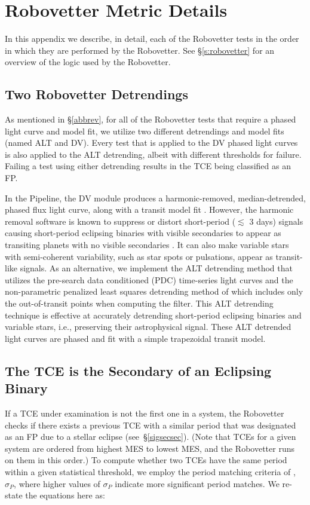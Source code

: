 \section{Robovetter Metric Details}
\label{s:metrics}
In this appendix we describe, in detail, each of the Robovetter tests in the order in which they are performed by the Robovetter. See \S\ref{s:robovetter} for an overview of the logic used by the Robovetter.

\subsection{Two Robovetter Detrendings}
As mentioned in \S\ref{abbrev}, for all of the Robovetter tests that require a phased light curve and model fit, we utilize two different detrendings and model fits (named ALT and DV). Every test that is applied to the DV phased light curves is also applied to the ALT detrending, albeit with different thresholds for failure. Failing a test using either detrending results in the TCE being classified as an FP.

In the \kepler{} Pipeline, the DV module produces a harmonic-removed, median-detrended, phased flux light curve, along with a transit model fit \citep{JenkinsKDPH,Wu2010}. However, the harmonic removal software is known to suppress or distort short-period ($\lesssim$ 3 days) signals causing short-period eclipsing binaries with visible secondaries to appear as transiting planets with no visible secondaries \citep{Christiansen2013b}. It can also make variable stars with semi-coherent variability, such as star spots or pulsations, appear as transit-like signals. As an alternative, we implement the ALT detrending method that utilizes the pre-search data conditioned (PDC) time-series light curves and the non-parametric penalized least squares detrending method of \citet{Garcia2010} which includes only the out-of-transit points when computing the filter. This ALT detrending technique is effective at accurately detrending short-period eclipsing binaries and variable stars, i.e., preserving their astrophysical signal.  These ALT detrended light curves are phased and fit with a simple trapezoidal transit model. 



\subsection{The TCE is the Secondary of an Eclipsing Binary}
\label{s:issecond}
If a TCE under examination is not the first one in a system, the Robovetter checks if there exists a previous TCE with a similar period that was designated as an FP due to a stellar eclipse (see~\S\ref{sigsecsec}). (Note that TCEs for a given system are ordered from highest MES to lowest MES, and the Robovetter runs on them in this order.) To compute whether two TCEs have the same period within a given statistical threshold, we employ the period matching criteria of \citet[][see equations 1-3]{Coughlin2014a}, $\sigma_{P}$, where higher values of $\sigma_{P}$ indicate more significant period matches. We re-state the equations here as:

